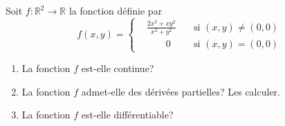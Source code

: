 \documentclass[a4paper]{tp_um}
\begin{document}
\exo{}
Soit $f : \mathbb R^2 \to \mathbb R$ la fonction d\'efinie par
\[
f(x,y) =
\left\{
\begin{aligned}
&\frac{2x^3 + x y^2}{x^2 + y^2} \quad &\text{si } (x,y) \neq (0,0) \\
& \qquad 0 \quad &\text{si } (x,y) = (0,0)
\end{aligned}
\right.
\]
\begin{enumerate}
\item La fonction $f$ est-elle continue?





\item La fonction $f$ admet-elle des d\'eriv\'ees partielles? Les calculer.




\item La fonction $f$ est-elle diff\'erentiable?



\end{enumerate}
\end{document}

